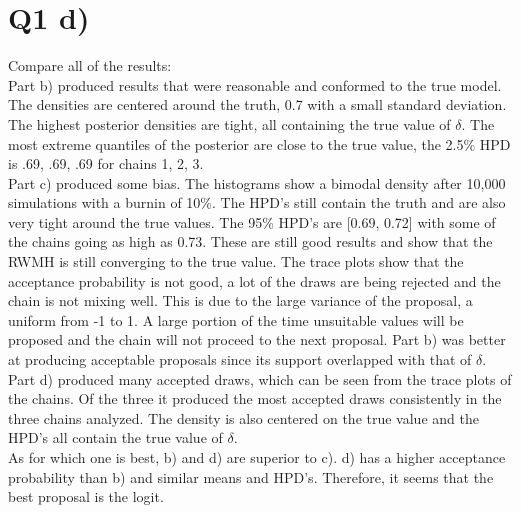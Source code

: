 \documentclass{article}
\begin{document}
\section*{Q1 d)}
Compare all of the results: \\
Part b) produced results that were  reasonable and conformed to the true model. The densities are centered around the truth, 0.7 with a small standard deviation. The highest posterior densities are tight, all containing the true value of $\delta$. The most extreme quantiles of the posterior are close to the true value, the 2.5\% HPD is .69, .69, .69 for chains 1, 2, 3. \\
Part c) produced some bias. The histograms show a bimodal density after 10,000 simulations with a burnin of 10\%. The HPD's still contain the truth and are also very tight around the true values. The 95\% HPD's are [0.69, 0.72] with some of the chains going as high as 0.73. These are still good results and show that the RWMH is still converging to the true value. The trace plots show that the acceptance probability is not good, a lot of the draws are being rejected and the chain is not mixing well. This is due to the large variance of the proposal, a uniform from -1 to 1. A large portion of the time unsuitable values will be proposed and the chain will not proceed to the next proposal. Part b) was better at producing acceptable proposals since its support overlapped with that of $\delta$.
Part d) produced many accepted draws, which can be seen from the trace plots of the chains. Of the three it produced the most accepted draws consistently in the three chains analyzed. The density is also centered on the true value and the HPD's all contain the true value of $\delta$. \\
As for which one is best, b) and d) are superior to c). d) has a higher acceptance probability than b) and similar means and HPD's. Therefore, it seems that the best proposal is the logit. 
\newpage
\end{document}
